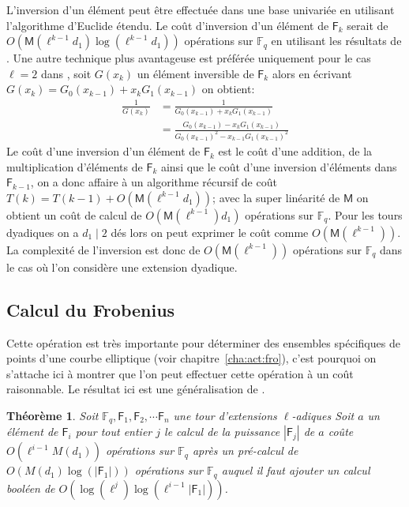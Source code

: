 \documentclass[10pt,a4paper]{book}
\theoremstyle{plain}
\newtheorem{thm}{Théorème}[chapter]
\theoremstyle{definition}
\theoremstyle{definition}
\theoremstyle{definition}
\theoremstyle{definition}
\theoremstyle{remark}
\theoremstyle{remark}
\theoremstyle{definition}
\begin{document}
L'inversion d'un élément peut être effectuée dans une base univariée en utilisant l'algorithme d'Euclide étendu. Le coût d'inversion d'un élément de $\mathsf{F}_k$ serait de $O(\mathsf{M}(\ell^{k-1}d_1)\log(\ell^{k-1}d_1))$ opérations sur $\mathbb{F}_q$ en utilisant les résultats de \cite[ch.11]{vzGJG03}. Une autre technique plus avantageuse est préférée uniquement pour le cas $\ell=2$ dans \cite{Doliskani-Schost15}, soit $G(x_k)$ un élément inversible de $\mathsf{F}_k$ alors en écrivant $G(x_k)=G_0(x_{k-1})+x_kG_1(x_{k-1})$ on obtient:
\begin{align*}
\frac{1}{G(x_k)} &=\frac{1}{G_0(x_{k-1})+x_kG_1(x_{k-1})} \\
 				&= \frac{G_0(x_{k-1})-x_kG_1(x_{k-1})}{G_0(x_{k-1})^2-x_{k-1}G_1(x_{k-1})^2}
\end{align*}
Le coût d'une inversion d'un élément de $\mathsf{F}_k$ est le coût d'une addition, de la multiplication d'éléments de $\mathsf{F}_k$ ainsi que le coût d'une inversion d'éléments dans $\mathsf{F}_{k-1}$, on a donc affaire à un algorithme récursif de coût  $T(k)=T(k-1)+O(\mathsf{M}(\ell^{k-1}d_1))$; avec la super linéarité de $\mathsf{M}$ on obtient un coût de calcul de $O(\mathsf{M}(\ell^{k-1})d_1)$ opérations sur $\mathbb{F}_q$. Pour les tours dyadiques on a $d_1 \mid 2$ dés lors on peut exprimer le coût comme $O(\mathsf{M}(\ell^{k-1}))$. La complexité de l'inversion est donc de $O(\mathsf{M}(\ell^{k-1}))$ opérations sur $\mathbb{F}_q$ dans le cas où l'on considère une extension dyadique.

\subsection*{Calcul du Frobenius}

Cette opération est très importante pour déterminer des ensembles spécifiques de points d'une courbe elliptique (voir chapitre~\ref{cha:act:fro}), c'est pourquoi on s'attache ici à montrer que l'on peut effectuer cette opération à un coût raisonnable. Le résultat ici est une généralisation de \cite{Doliskani-Schost15}.

\begin{thm} \label{thm:frob-ell}
Soit $\mathbb{F}_q, \mathsf{F}_1, \mathsf{F}_2,  \cdots \mathsf{F}_n$ une tour d'extensions $\ell$-adiques
Soit $a$ un élément de $\mathsf{F}_i$ pour tout entier $j$ le calcul de la puissance $|\mathsf{F}_j|$ de $a$ coûte
 $O(\ell^{i-1}M(d_1))$ opérations sur $\mathbb{F}_q$ après un pré-calcul de $O( M(d_1)\log(|\mathsf{F}_1|))$ opérations sur $\mathbb{F}_q$
auquel il faut ajouter un calcul booléen de $O(\log(\ell^j)\log(\ell^{i-1}|\mathsf{F}_1|))$.
\end{thm} 
\end{document}
